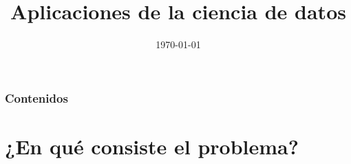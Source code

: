 \documentclass{beamer}
\title[Ciencia de datos]{Aplicaciones de la ciencia de datos} %
\author[@ncordon \and fdavidcl \and @M42] %
{\texorpdfstring{
    \begin{columns}
      \column{.25\linewidth}
      \centering
      Ignacio Cordón\\
      \href{http://www.github.com/ncordon}{@ncordon}
      \column{.25\linewidth}
      \centering
      David Charte\\
      \href{http://www.github.com/fdavidcl}{@fdavidcl}
      \column{.25\linewidth}
      \centering
      Mario Román\\
      \href{http://www.github.com/M42}{@M42}
    \end{columns}
}{Ignacio Cordón \and David Charte \and Mario Román}}
\institute[UGR] %
{
  Universidad de Granada \\ %
  \medskip
}
\date{\today} %
\begin{document}
\begin{frame}
\titlepage %
\end{frame}

\begin{frame}
  \frametitle{Contenidos} %
  \tableofcontents
\end{frame}





\section{¿En qué consiste el problema?}
\end{document}
